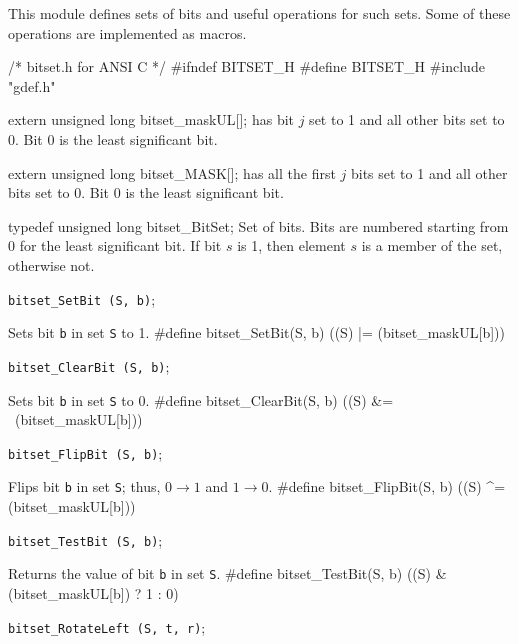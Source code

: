 
This module defines sets of bits and useful operations for such sets.
Some of these operations are implemented as macros.

\code\hide
/* bitset.h  for ANSI C */
#ifndef BITSET_H
#define BITSET_H
#include "gdef.h"
\endhide\endcode


\code

extern unsigned long bitset_maskUL[];
\endcode
  has bit $j$ set to 1 and all other bits set to
   0. Bit 0 is the least significant bit.
 \endtab
\code


extern unsigned long bitset_MASK[];
\endcode
  has all the first $j$ bits set to 1 and all other 
  bits set to 0. Bit 0 is the least significant bit. 
 \endtab


\code

typedef unsigned long bitset_BitSet;
\endcode
 \tab  Set of bits. Bits are numbered starting from 0 for the least
  significant bit. If bit $s$ is 1, then element $s$ is a member of 
  the set, otherwise not.
 \endtab




\noindent 
{\tt bitset\_SetBit (S, b)};

 \tab  Sets bit {\tt b} in set  {\tt S}  to 1.
 \endtab
\code
\hide
#define bitset_SetBit(S, b) ((S) |= (bitset_maskUL[b]))
\endhide
\endcode

\noindent 
{\tt bitset\_ClearBit (S, b)};

 \tab  Sets bit {\tt b} in set  {\tt S}  to 0.
 \endtab
\code
\hide
#define bitset_ClearBit(S, b) ((S) &= ~(bitset_maskUL[b]))
\endhide
\endcode

\noindent 
{\tt bitset\_FlipBit (S, b)};

 \tab  Flips bit {\tt b} in set {\tt S}; thus,
  $0 \rightarrow 1$ and $1 \rightarrow 0$.
 \endtab
\code
\hide
#define bitset_FlipBit(S, b) ((S) ^= (bitset_maskUL[b]))
\endhide
\endcode

\noindent 
{\tt bitset\_TestBit (S, b)};

 \tab  Returns the value of bit {\tt b} in set {\tt S}.
 \endtab
\code
\hide
#define bitset_TestBit(S, b)  ((S) & (bitset_maskUL[b]) ? 1 : 0)
\endhide
\endcode

\noindent 
{\tt bitset\_RotateLeft (S, t, r)};

